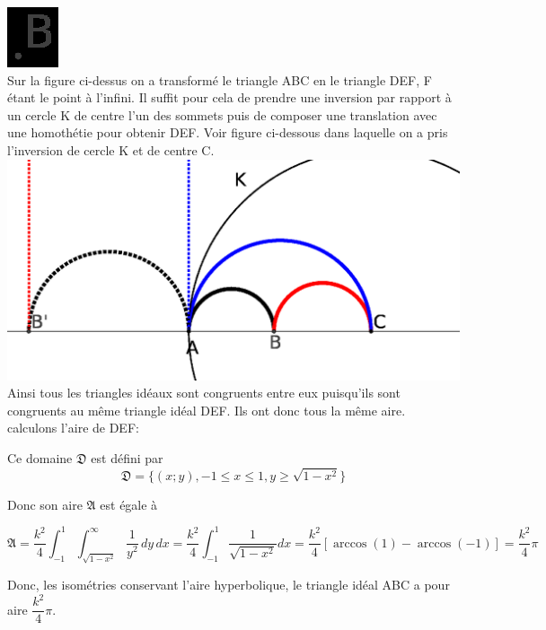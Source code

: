 \documentclass[a4paper, 12pt, twoside]{book}
\begin{document}
 
 \includegraphics[scale=0.5]{figures/hyper20.eps}\\
 
 Sur la figure ci-dessus on a transformé le triangle ABC en le triangle DEF, F étant le point à l'infini. Il suffit pour cela de prendre une inversion par rapport à un cercle K de centre l'un des sommets puis de composer une translation avec une homothétie pour obtenir DEF. Voir figure ci-dessous dans laquelle on a pris l'inversion de cercle K et de centre C.\\
 
 
 
   \includegraphics[scale=0.7]{figures/hyper21.eps}\\
   
   Ainsi tous les triangles idéaux sont congruents entre eux puisqu'ils sont congruents au même triangle idéal DEF. Ils ont donc tous la même aire.\\
   
   
   
  calculons l'aire de DEF:
  
  Ce domaine $\mathfrak{D}$ est défini par 
  $$\mathfrak{D}=\{(x;y), -1\leq x\leq 1, y\geq \sqrt{1-x^{2}}\}$$
  
  Donc son aire $\mathfrak{A}$ est égale à
  
  $$\mathfrak{A}=\dfrac{k^{2}}{4}\int _{-1}^{1}\int_{\sqrt{1-x^{2}}}^{\infty} \dfrac{1}{y^{2}} \,dy\,dx=\dfrac{k^{2}}{4}\int _{-1}^{1}\dfrac{1}{\sqrt{1-x^{2}}}dx=\dfrac{k^{2}}{4}[\arccos(1)- \arccos(-1) ]=\dfrac{k^{2}}{4}\pi$$
  
  Donc, les isométries conservant l'aire hyperbolique, le triangle idéal ABC a pour aire $\dfrac{k^{2}}{4}\pi$.\\
  
\end{document}
